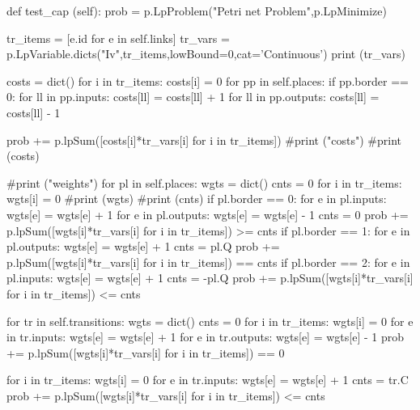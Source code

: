 \begin{python}
    def test_cap (self):
        prob = p.LpProblem("Petri net Problem",p.LpMinimize)

        tr_items = [e.id for e in self.links]
        tr_vars = p.LpVariable.dicts("Iv",tr_items,lowBound=0,cat='Continuous')
        print (tr_vars)
        
        costs = dict()
        for i in tr_items:
            costs[i] = 0
        for pp in self.places:
            if pp.border == 0:
                for ll in pp.inputs:
                    costs[ll] = costs[ll] + 1
                for ll in pp.outputs:
                    costs[ll] = costs[ll] - 1

        prob += p.lpSum([costs[i]*tr_vars[i] for i in tr_items])
        #print ("costs")
        #print (costs)
        
        #print ("weights")
        for pl in self.places:
            wgts = dict()
            cnts = 0
            for i in tr_items:
                wgts[i] = 0
            #print (wgts)
            #print (cnts)
            if pl.border == 0:
                for e in pl.inputs:
                    wgts[e] = wgts[e] + 1
                for e in pl.outputs:
                    wgts[e] = wgts[e] - 1
                cnts = 0
                prob += p.lpSum([wgts[i]*tr_vars[i] for i in tr_items]) >= cnts
            if pl.border == 1:
                for e in pl.outputs:
                    wgts[e] = wgts[e] + 1
                cnts = pl.Q
                prob += p.lpSum([wgts[i]*tr_vars[i] for i in tr_items]) == cnts
            if pl.border == 2:
                for e in pl.inputs:
                    wgts[e] = wgts[e] + 1
                cnts = -pl.Q
                prob += p.lpSum([wgts[i]*tr_vars[i] for i in tr_items]) <= cnts

        for tr in self.transitions:
            wgts = dict()
            cnts = 0
            for i in tr_items:
                wgts[i] = 0
            for e in tr.inputs:
                wgts[e] = wgts[e] + 1
            for e in tr.outputs:
                wgts[e] = wgts[e] - 1
            prob += p.lpSum([wgts[i]*tr_vars[i] for i in tr_items]) == 0
            
            for i in tr_items:
                wgts[i] = 0
            for e in tr.inputs:
                wgts[e] = wgts[e] + 1
            cnts = tr.C
            prob += p.lpSum([wgts[i]*tr_vars[i] for i in tr_items]) <= cnts


\end{python}
